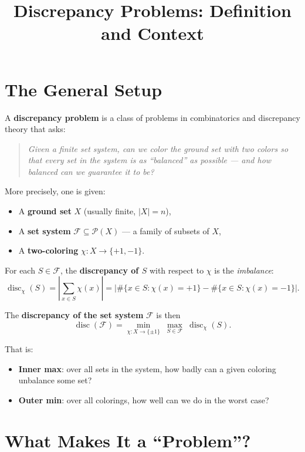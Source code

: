 \documentclass[11pt]{article}
\title{Discrepancy Problems: Definition and Context}
\author{}
\date{}
\DeclareMathOperator{\disc}{disc}
\begin{document}
\maketitle

\section{The General Setup}

A \textbf{discrepancy problem} is a class of problems in combinatorics
and discrepancy theory that asks:

\begin{quote}
\itshape
Given a finite set system, can we color the ground set with two colors
so that every set in the system is as ``balanced'' as possible --- and
how balanced can we guarantee it to be?
\end{quote}

More precisely, one is given:

\begin{itemize}
  \item A \textbf{ground set} \(X\) (usually finite, \(|X| = n\)),
  \item A \textbf{set system} \(\mathcal{F} \subseteq \mathcal{P}(X)\)
        --- a family of subsets of \(X\),
  \item A \textbf{two-coloring} \(\chi \colon X \to \{+1, -1\}\).
\end{itemize}

For each \(S \in \mathcal{F}\), the \textbf{discrepancy of \(S\)} with
respect to \(\chi\) is the \emph{imbalance}:
\[
\disc_\chi(S)
= \left| \sum_{x \in S} \chi(x) \right|
= \bigl| \#\{x \in S : \chi(x) = +1\}
       - \#\{x \in S : \chi(x) = -1\} \bigr|.
\]

The \textbf{discrepancy of the set system} \(\mathcal{F}\) is then
\[
\disc(\mathcal{F})
= \min_{\chi \colon X \to \{\pm 1\}}
  \; \max_{S \in \mathcal{F}} \;
  \disc_\chi(S).
\]

That is:

\begin{itemize}
  \item \textbf{Inner max}: over all sets in the system, how badly can a
        given coloring unbalance some set?
  \item \textbf{Outer min}: over all colorings, how well can we do in the
        worst case?
\end{itemize}

\hrulefill

\section{What Makes It a ``Problem''?}
\end{document}
